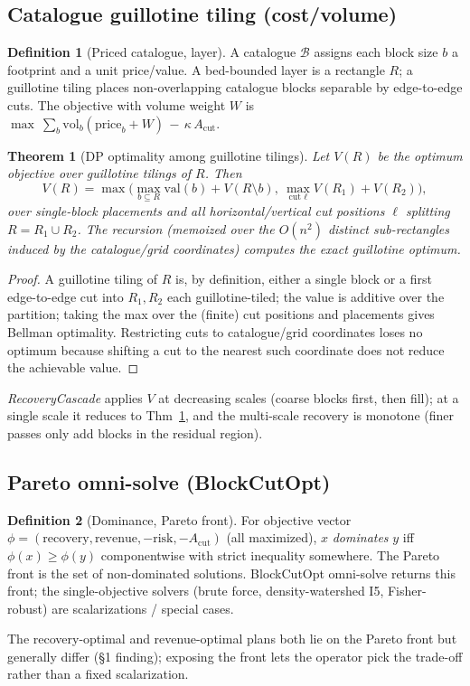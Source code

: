 \documentclass[11pt]{article}
\theoremstyle{definition}\newtheorem{definition}{Definition}[section]
\theoremstyle{plain}\newtheorem{theorem}{Theorem}[section]
\begin{document}
\subsection{Catalogue guillotine tiling (cost/volume)}
\begin{definition}[Priced catalogue, layer]
A catalogue $\mathcal B$ assigns each block size $b$ a footprint and a unit price/value. A bed-bounded layer is
a rectangle $R$; a guillotine tiling places non-overlapping catalogue blocks separable by edge-to-edge cuts.
The objective with volume weight $W$ is $\max\ \sum_b \mathrm{vol}_b(\mathrm{price}_b+W)\,-\,\kappa\,A_{\mathrm{cut}}$.
\end{definition}
\begin{theorem}[DP optimality among guillotine tilings]\label{thm:guillodp}
Let $V(R)$ be the optimum objective over guillotine tilings of $R$. Then
\[V(R)=\max\Big(\max_{b\subseteq R}\mathrm{val}(b)+V(R\setminus b),\ \max_{\text{cut }\ell}V(R_1)+V(R_2)\Big),\]
over single-block placements and all horizontal/vertical cut positions $\ell$ splitting $R=R_1\cup R_2$. The
recursion (memoized over the $O(n^2)$ distinct sub-rectangles induced by the catalogue/grid coordinates)
computes the exact guillotine optimum.
\end{theorem}
\begin{proof}
A guillotine tiling of $R$ is, by definition, either a single block or a first edge-to-edge cut into $R_1,R_2$
each guillotine-tiled; the value is additive over the partition; taking the max over the (finite) cut
positions and placements gives Bellman optimality. Restricting cuts to catalogue/grid coordinates loses no
optimum because shifting a cut to the nearest such coordinate does not reduce the achievable value.
\end{proof}
\noindent\emph{RecoveryCascade} applies $V$ at decreasing scales (coarse blocks first, then fill); at a
single scale it reduces to Thm~\ref{thm:guillodp}, and the multi-scale recovery is monotone (finer passes only
add blocks in the residual region).

\subsection{Pareto omni-solve (BlockCutOpt)}
\begin{definition}[Dominance, Pareto front]
For objective vector $\phi=(\text{recovery},\text{revenue},-\text{risk},-A_{\mathrm{cut}})$ (all maximized),
$x$ \emph{dominates} $y$ iff $\phi(x)\ge\phi(y)$ componentwise with strict inequality somewhere. The Pareto
front is the set of non-dominated solutions. BlockCutOpt omni-solve returns this front; the single-objective
solvers (brute force, density-watershed I5, Fisher-robust) are scalarizations / special cases.
\end{definition}
\begin{proposition}
The recovery-optimal and revenue-optimal plans both lie on the Pareto front but generally differ (\S1
finding); exposing the front lets the operator pick the trade-off rather than a fixed scalarization.
\end{proposition}
\end{document}
